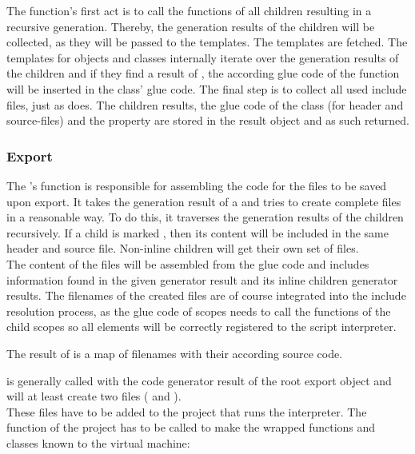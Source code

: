 The  function's first act is to call the  functions of all children resulting in a recursive generation. Thereby, the generation results of the children will be collected, as they will be passed to the templates. The templates are fetched. The templates for objects and classes internally iterate over the generation results of the children and if they find a result of  , the according glue code of the function will be inserted in the class' glue code.
The final step is to collect all used include files, just as  does.  The children results, the glue code  of the class (for header and source-files) and the  property are stored in the result object and as such returned.

\subsubsection{Export}

The 's  function is responsible for assembling the code for the files to be saved upon export. It takes the generation result of a \linebreak{} and tries to create complete files in a reasonable way. To do this, it traverses the generation results of the children recursively. If a child is marked , then its content will be included in the same header and source file. Non-inline children will get their own set of files.\\
The content of the files will be assembled from the glue code and includes information found in the given generator result and its inline children generator results. The filenames of the created files are of course integrated into the include resolution process, as the glue code of scopes needs to call the  functions of the child scopes so all elements will be correctly registered to the script interpreter.

The result of  is a map of filenames with their according source code.

 is generally called with the code generator result of the root export object and will at least create two files ( and ).\\
These files have to be added to the  project that runs the  interpreter. The  function of the project has to be called to make the wrapped functions and classes known to the virtual machine:

